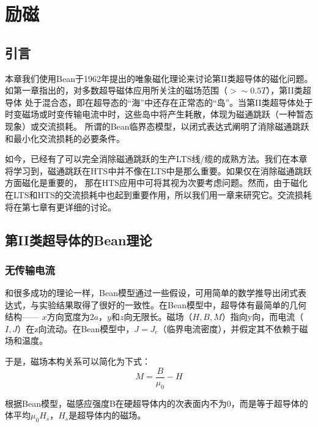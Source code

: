 \chapter{励磁}
\section{引言}
本章我们使用Bean于1962年提出的唯象磁化理论来讨论第II类超导体的磁化问题。如第一章指出的，对多数超导磁体应用所关注的磁场范围（$>\sim 0.5T$），第II类超导体
处于混合态，即在超导态的“海”中还存在正常态的“岛”。当第II类超导体处于时变磁场或时变传输电流中时，这些岛中将产生耗散，体现为磁通跳跃（一种暂态现象）或交流损耗。
所谓的Bean临界态模型，以闭式表达式阐明了消除磁通跳跃和最小化交流损耗的必要条件。

如今，已经有了可以完全消除磁通跳跃的生产LTS线/缆的成熟方法。我们在本章将学习到，磁通跳跃在HTS中并不像在LTS中是那么重要。如果仅在消除磁通跳跃方面磁化是重要的，
那在HTS应用中可将其视为次要考虑问题。然而，由于磁化在LTS和HTS的交流损耗中也起到重要作用，所以我们用一章来研究它。交流损耗将在第七章有更详细的讨论。

\section{第II类超导体的Bean理论}
\subsection{无传输电流}
和很多成功的理论一样，Bean模型通过一些假设，可用简单的数学推导出闭式表达式，与实验结果取得了很好的一致性。在Bean模型中，超导体有最简单的几何结构——
$x$方向宽度为$2a$，$y$和$z$向无限长。磁场（$H, B, M$）指向y向，而电流（$I, J$）在z向流动。在Bean模型中，$J=J_c$（临界电流密度），并假定其不依赖于磁场和温度。

于是，磁场本构关系可以简化为下式：
\begin{equation}
  M=\frac{B}{\mu_0} -H
\end{equation}

根据Bean模型，磁感应强度B在硬超导体内的次表面内不为0，而是等于超导体的体平均$\mu_0 H_s$，$H_s$是超导体内的磁场。

